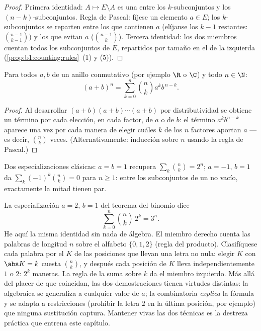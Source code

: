 \begin{proof}
Primera identidad: $A \mapsto E \setminus A$ es una  entre los
$k$-subconjuntos y los $(n-k)$-subconjuntos. Regla de
Pascal: fíjese un elemento $a \in E$; los
$k$-subconjuntos se reparten entre los que contienen $a$ (elíjanse los
$k - 1$ restantes: $\binom{n-1}{k-1}$) y los que evitan $a$
($\binom{n-1}{k}$). Tercera identidad: los dos miembros cuentan todos
los subconjuntos de $E$, repartidos por tamaño en el de la izquierda
(\cref{prop:b1:counting:rules}~(1) y (5)).
\end{proof}

\begin{theorem}\label{thm:b1:counting:binomial}
Para todos $a, b$ de un anillo conmutativo (por ejemplo $\R$ o $\C$) y todo $n \in \N$:
\[
(a + b)^n = \sum_{k=0}^{n} \binom{n}{k} a^k b^{\,n-k} .
\]
\end{theorem}

\begin{proof}
Al desarrollar $(a+b)(a+b)\cdots(a+b)$ por distributividad se obtiene
un término por cada elección, en cada factor, de $a$ o de $b$: el
término $a^k b^{n-k}$ aparece una vez por cada manera de elegir cuáles
$k$ de los $n$ factores aportan $a$ --- es decir, $\binom nk$ veces.
(Alternativamente: inducción sobre $n$ usando la regla de Pascal.)
\end{proof}

\begin{example}\label{ex:b1:counting:binomial}
Dos especializaciones clásicas: $a = b = 1$ recupera
$\sum_k \binom nk = 2^n$; $a = -1$, $b = 1$ da
$\sum_{k} (-1)^k \binom nk = 0$ para $n \geq 1$: entre los
subconjuntos de un  no vacío, exactamente la mitad tienen
 par.
\end{example}

\begin{example}\label{ex:b1:counting:threen}
La especialización $a = 2$, $b = 1$ del teorema del binomio dice
\[
\sum_{k=0}^{n} \binom nk\,2^k = 3^n .
\]
He aquí la misma identidad sin nada de álgebra. El miembro derecho
cuenta las palabras de longitud $n$ sobre el alfabeto $\{0, 1, 2\}$
(regla del producto). Clasifíquese cada palabra por el  $K$ de
las posiciones que llevan una letra no nula: elegir $K$ con
$\abs K = k$ cuesta $\binom nk$, y después cada posición de $K$ lleva
independientemente $1$ o $2$: $2^k$ maneras. La regla de la suma sobre
$k$ da el miembro izquierdo. Más allá del placer de que coincidan, las
dos demostraciones tienen virtudes distintas: la algebraica se
generaliza a cualquier valor de $a$; la combinatoria \emph{explica} la
fórmula y se adapta a restricciones (prohibir la letra $2$ en la última
posición, por ejemplo) que ninguna sustitución captura. Mantener vivas
las dos técnicas es la destreza práctica que entrena este capítulo.
\end{example}

